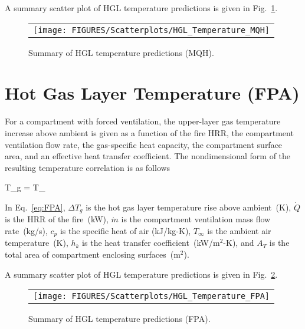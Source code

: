 \clearpage

A summary scatter plot of HGL temperature predictions is given in Fig.~\ref{hgl_temperature_MQH_summary}. 

\begin{figure}[ht]
\begin{center}
\begin{tabular}{l}
\texttt{[image: FIGURES/Scatterplots/HGL\_Temperature\_MQH]}
\end{tabular}
\end{center}
\caption[Summary of HGL temperature predictions (MQH).]
{Summary of HGL temperature predictions (MQH).}
\label{hgl_temperature_MQH_summary}
\end{figure}


\clearpage


\section{Hot Gas Layer Temperature (FPA)}

For a compartment with forced ventilation, the upper-layer gas temperature increase above ambient is given as a function of the fire HRR, the compartment ventilation flow rate, the gas-specific heat capacity, the compartment surface area, and an effective heat transfer coefficient. The nondimensional form of the resulting temperature correlation is as follows

\be
\Delta T_g =  T_\infty
\label{eq:FPA}
\ee

In Eq.~\ref{eq:FPA}, $\Delta T_g$ is the hot gas layer temperature rise above ambient~(K), $\dot Q$ is the HRR of the fire~(kW), $\dot m$ is the compartment ventilation mass flow rate~(kg/s), $c_p$ is the specific heat of air (kJ/kg-K), $T_\infty$ is the ambient air temperature~(K), $h_k$ is the heat transfer coefficient~(kW/m$^2$-K), and $A_T$ is the total area of compartment enclosing surfaces~(m$^2$).

\clearpage

A summary scatter plot of HGL temperature predictions is given in Fig.~\ref{hgl_temperature_FPA_summary}. 

\begin{figure}[ht]
\begin{center}
\begin{tabular}{l}
\texttt{[image: FIGURES/Scatterplots/HGL\_Temperature\_FPA]}
\end{tabular}
\end{center}
\caption[Summary of HGL temperature predictions (FPA).]
{Summary of HGL temperature predictions (FPA).}
\label{hgl_temperature_FPA_summary}
\end{figure}


